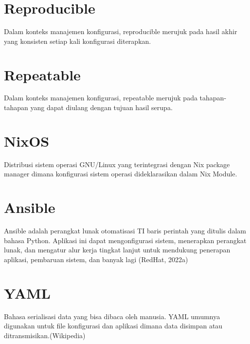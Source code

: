 \documentclass[10pt,twoside]{report}
\begin{document}
\section{Reproducible}
\begin{adjustwidth}{20pt}{}
	\vspace{-3mm}
	Dalam konteks manajemen konfigurasi, reproducible merujuk pada hasil akhir
	yang konsisten setiap kali konfigurasi diterapkan.
\end{adjustwidth}
\section{Repeatable}
\begin{adjustwidth}{20pt}{}
	\vspace{-3mm}
	Dalam konteks manajemen konfigurasi, repeatable merujuk pada tahapan-tahapan
	yang dapat diulang dengan tujuan hasil serupa.
\end{adjustwidth}
\section{NixOS}
\begin{adjustwidth}{20pt}{}
	\vspace{-3mm}
	Distribusi sistem operasi GNU/Linux yang terintegrasi dengan Nix package
	manager dimana konfigurasi sistem operasi dideklarasikan dalam Nix Module.
\end{adjustwidth}
\section{Ansible}
\begin{adjustwidth}{20pt}{}
	\vspace{-3mm}
	Ansible adalah perangkat lunak otomatisasi TI baris perintah yang ditulis dalam
	bahasa Python. Aplikasi ini dapat mengonfigurasi sistem, menerapkan perangkat
	lunak, dan mengatur alur kerja tingkat lanjut untuk mendukung penerapan
	aplikasi, pembaruan sistem, dan banyak lagi (RedHat, 2022a)
\end{adjustwidth}
\section{YAML}
\begin{adjustwidth}{20pt}{}
	\vspace{-3mm}
	Bahasa serialisasi data yang bisa dibaca oleh manusia. YAML umumnya digunakan
	untuk file konfigurasi dan aplikasi dimana data disimpan atau
	ditransmisikan.(Wikipedia)
\end{adjustwidth}
\end{document}
